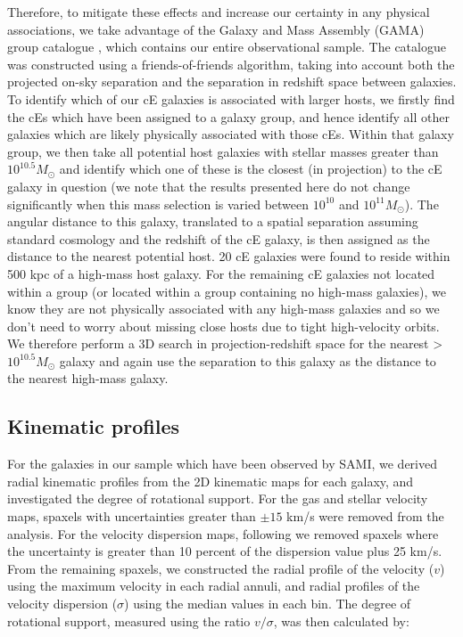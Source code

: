 \documentclass[a4paper,fleqn,usenatbib]{mnras}
\begin{document}
Therefore, to mitigate these effects and increase our certainty in any physical associations, we take advantage of the Galaxy and Mass Assembly (GAMA) group catalogue \citep{2011MNRAS.416.2640R}, which contains our entire observational sample. The catalogue was constructed using a friends-of-friends algorithm, taking into account both the projected on-sky separation and the separation in redshift space between galaxies. To identify which of our cE galaxies is associated with larger hosts, we firstly find the cEs which have been assigned to a galaxy group, and hence identify all other galaxies which are likely physically associated with those cEs. Within that galaxy group, we then take all potential host galaxies with stellar masses greater than $10^{10.5}M_{\odot}$ and identify which one of these is the closest (in projection) to the cE galaxy in question (we note that the results presented here do not change significantly when this mass selection is varied between $10^{10}$ and $10^{11}M_{\odot}$). The angular distance to this galaxy, translated to a spatial separation assuming standard cosmology and the redshift of the cE galaxy, is then assigned as the distance to the nearest potential host. 20 cE galaxies were found to reside within 500 kpc of a high-mass host galaxy. For the remaining cE galaxies not located within a group (or located within a group containing no high-mass galaxies), we know they are not physically associated with any high-mass galaxies and so we don't need to worry about missing close hosts due to tight high-velocity orbits. We therefore perform a 3D search in projection-redshift space for the nearest  >$10^{10.5}M_{\odot}$ galaxy and again use the separation to this galaxy as the distance to the nearest high-mass galaxy. 



\subsection{Kinematic profiles}

For the galaxies in our sample which have been observed by SAMI, we derived radial kinematic profiles from the 2D kinematic maps for each galaxy, and investigated the degree of rotational support. For the gas and stellar velocity maps, spaxels with uncertainties greater than $\pm15$ km/s were removed from the analysis. For the velocity dispersion maps, following \citet{2017ApJ...835..104V} we removed spaxels where the uncertainty is greater than 10 percent of the dispersion value plus 25 km/s. From the remaining spaxels, we constructed the radial profile of the velocity ($v$) using the maximum velocity in each radial annuli, and radial profiles of the velocity dispersion ($\sigma$) using the median values in each bin. The degree of rotational support, measured using the ratio $v/\sigma$, was then calculated by:
\end{document}
